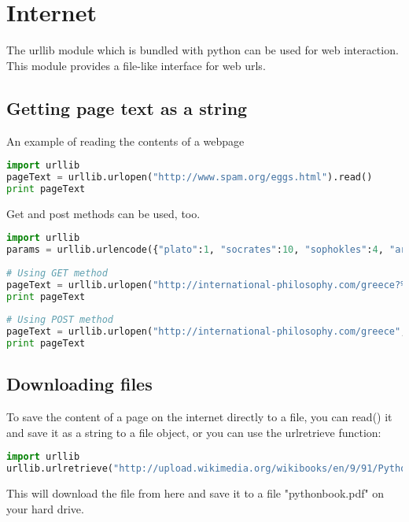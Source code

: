 \section{Internet}
The urllib module which is bundled with python can be used for web interaction.
This module provides a file-like interface for web urls.
\subsection{Getting page text as a string}
An example of reading the contents of a webpage
\lstset{basicstyle=\scriptsize, numbers=left, captionpos=b, tabsize=4}
\begin{lstlisting}[caption=Read Webpage,language={Python},
xleftmargin=15pt, label=lst:readwebpage]
import urllib
pageText = urllib.urlopen("http://www.spam.org/eggs.html").read()
print pageText
\end{lstlisting}

Get and post methods can be used, too.
\lstset{basicstyle=\scriptsize, numbers=left, captionpos=b, tabsize=4}
\begin{lstlisting}[caption=Get and Post,language={Python},
xleftmargin=15pt, label=lst:getandpost]
import urllib
params = urllib.urlencode({"plato":1, "socrates":10, "sophokles":4, "arkhimedes":11})
 
# Using GET method
pageText = urllib.urlopen("http://international-philosophy.com/greece?%s" % params).read()
print pageText
 
# Using POST method
pageText = urllib.urlopen("http://international-philosophy.com/greece", params).read()
print pageText
\end{lstlisting}

\subsection{Downloading files}
To save the content of a page on the internet directly to a file, you can read()
it and save it as a string to a file object, or you can use the urlretrieve
function:
\lstset{basicstyle=\scriptsize, numbers=left, captionpos=b, tabsize=4}
\begin{lstlisting}[caption=Download File,language={Python},
xleftmargin=15pt, label=lst:downloadfile]
import urllib
urllib.urlretrieve("http://upload.wikimedia.org/wikibooks/en/9/91/Python_Programming.pdf", "pythonbook.pdf")
\end{lstlisting}

This will download the file from here and save it to a file "pythonbook.pdf" on
your hard drive.

